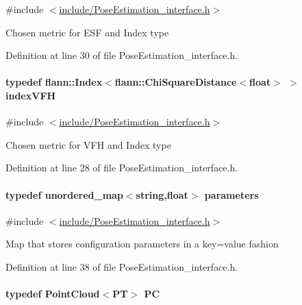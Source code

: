 {\ttfamily \#include $<$\hyperlink{PoseEstimation__interface_8h}{include/\-Pose\-Estimation\-\_\-interface.\-h}$>$}

Chosen metric for E\-S\-F and Index type 

Definition at line 30 of file Pose\-Estimation\-\_\-interface.\-h.

\hypertarget{group__Definitions_gacea1a4bf0f6b886a58ff00ff9cb54b34}{
\paragraph[{index\-V\-F\-H}]{\setlength{\rightskip}{0pt plus 5cm}typedef flann\-::\-Index$<$flann\-::\-Chi\-Square\-Distance$<$float$>$ $>$ {\bf index\-V\-F\-H}}}\label{group__Definitions_gacea1a4bf0f6b886a58ff00ff9cb54b34}


{\ttfamily \#include $<$\hyperlink{PoseEstimation__interface_8h}{include/\-Pose\-Estimation\-\_\-interface.\-h}$>$}

Chosen metric for V\-F\-H and Index type 

Definition at line 28 of file Pose\-Estimation\-\_\-interface.\-h.

\hypertarget{group__Definitions_gacbb28d8f791bb363852e522cf3b83c47}{
\paragraph[{parameters}]{\setlength{\rightskip}{0pt plus 5cm}typedef unordered\-\_\-map$<$string,float$>$ {\bf parameters}}}\label{group__Definitions_gacbb28d8f791bb363852e522cf3b83c47}


{\ttfamily \#include $<$\hyperlink{PoseEstimation__interface_8h}{include/\-Pose\-Estimation\-\_\-interface.\-h}$>$}

Map that stores configuration parameters in a key=value fashion 

Definition at line 38 of file Pose\-Estimation\-\_\-interface.\-h.

\hypertarget{group__Definitions_ga62eb21fcfa3189c5de50fb62a2a7a79e}{
\paragraph[{P\-C}]{\setlength{\rightskip}{0pt plus 5cm}typedef Point\-Cloud$<${\bf P\-T}$>$ {\bf P\-C}}}\label{group__Definitions_ga62eb21fcfa3189c5de50fb62a2a7a79e}


